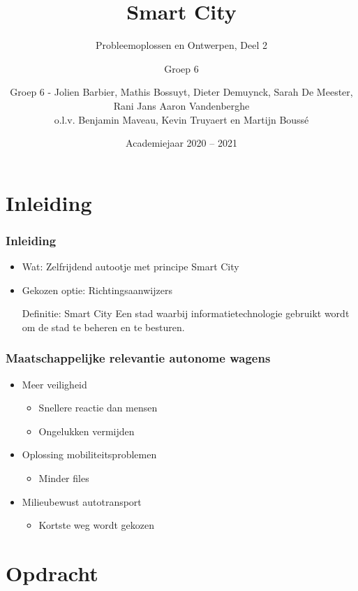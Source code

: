 \documentclass
   [kulak,aspectratio=169,<options>] %
   {kulakbeamer}
\title[Smart City]{Smart City}
\subtitle{\scriptsize Probleemoplossen en Ontwerpen, Deel 2}
\author[Groep 6]{Groep 6}%
\date{Academiejaar 2020 -- 2021}
\author{\scriptsize Groep 6
	\tiny - Jolien Barbier, Mathis Bossuyt, Dieter Demuynck, Sarah De Meester, Rani Jans Aaron Vandenberghe
	\\o.l.v. Benjamin Maveau, Kevin Truyaert en Martijn Boussé}
\begin{document}
\begin{titleframe}
\titlepage
\end{titleframe}


\section*{Inleiding}

\begin{frame}
\frametitle{Inleiding}
\begin{itemize}
	
	\item Wat: Zelfrijdend autootje met principe Smart City 
	\item Gekozen optie: Richtingsaanwijzers

	\begin{block}{Definitie: Smart City}
		Een stad waarbij informatietechnologie gebruikt wordt om de stad te beheren en te besturen. \cite{SmartCity}
	\end{block}
\end{itemize}
\end{frame}

\begin{frame}
\frametitle{Maatschappelijke relevantie autonome wagens}
\begin{itemize}
	\item Meer veiligheid
	\begin{itemize}
		\item Snellere reactie dan mensen
		\item Ongelukken vermijden
	\end{itemize}
	\item Oplossing mobiliteitsproblemen
	\begin{itemize}
		\item Minder files
	\end{itemize}
	\item Milieubewust autotransport
	\begin{itemize}
		\item Kortste weg wordt gekozen
	\end{itemize}

\end{itemize}
\end{frame}


\section[Opdracht]{Opdracht}%
\end{document}
